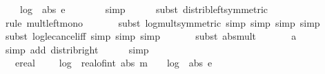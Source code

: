 \begin{isabellebody}
\ \ \ \ log\ {}\ {\isacharparenleft}{\kern0pt}abs\ e\ {\isacharplus}{\kern0pt}\ {}{\isacharparenright}{\kern0pt}{\isacharparenright}{\kern0pt}{\isacharparenright}{\kern0pt}{\isachardoublequoteclose}\isanewline
\ \ \ \ \isamarkupfalse%
\ {\isacharparenleft}{\kern0pt}simp{\isacharparenright}{\kern0pt}\isanewline
\ \ \ \ \isamarkupfalse%
\ {\isacharparenleft}{\kern0pt}subst\ distrib{\isacharunderscore}{\kern0pt}left{\isacharbrackleft}{\kern0pt}symmetric{\isacharbrackright}{\kern0pt}{\isacharparenright}{\kern0pt}\isanewline
\ \ \ \ \isamarkupfalse%
\ {\isacharparenleft}{\kern0pt}rule\ mult{\isacharunderscore}{\kern0pt}left{\isacharunderscore}{\kern0pt}mono{\isacharparenright}{\kern0pt}\isanewline
\ \ \ \ \ \isamarkupfalse%
\ {\isacharparenleft}{\kern0pt}subst\ log{\isacharunderscore}{\kern0pt}mult{\isacharbrackleft}{\kern0pt}symmetric{\isacharbrackright}{\kern0pt}{\isacharcomma}{\kern0pt}\ simp{\isacharcomma}{\kern0pt}\ simp{\isacharcomma}{\kern0pt}\ simp{\isacharcomma}{\kern0pt}\ simp{\isacharparenright}{\kern0pt}\isanewline
\ \ \ \ \ \isamarkupfalse%
\ {\isacharparenleft}{\kern0pt}subst\ log{\isacharunderscore}{\kern0pt}le{\isacharunderscore}{\kern0pt}cancel{\isacharunderscore}{\kern0pt}iff{\isacharcomma}{\kern0pt}\ simp{\isacharcomma}{\kern0pt}\ simp{\isacharcomma}{\kern0pt}\ simp{\isacharparenright}{\kern0pt}\isanewline
\ \ \ \ \ \isamarkupfalse%
\ {\isacharparenleft}{\kern0pt}subst\ abs{\isacharunderscore}{\kern0pt}mult{\isacharparenright}{\kern0pt}\isanewline
\ \ \ \ \ \isamarkupfalse%
\ a\ \isamarkupfalse%
\ {\isacharparenleft}{\kern0pt}simp\ add{\isacharcolon}{\kern0pt}\ distrib{\isacharunderscore}{\kern0pt}right{\isacharparenright}{\kern0pt}\isanewline
\ \ \ \ \isamarkupfalse%
\ simp\isanewline
\ \ \isamarkupfalse%
\ \isamarkupfalse%
\ {\isachardoublequoteopen}{\isachardot}{\kern0pt}{\isachardot}{\kern0pt}{\isachardot}{\kern0pt}\ {\isacharequal}{\kern0pt}\ ereal\ {\isacharparenleft}{\kern0pt}{}\ {\isacharplus}{\kern0pt}\ {}\ {\isacharasterisk}{\kern0pt}\ {\isacharparenleft}{\kern0pt}log\ {}\ {\isacharparenleft}{\kern0pt}real{\isacharunderscore}{\kern0pt}of{\isacharunderscore}{\kern0pt}int\ {\isacharparenleft}{\kern0pt}abs\ m{\isacharparenright}{\kern0pt}\ {\isacharplus}{\kern0pt}\ {}{\isacharparenright}{\kern0pt}\ {\isacharplus}{\kern0pt}\ log\ {}\ {\isacharparenleft}{\kern0pt}abs\ e\ {\isacharplus}{\kern0pt}\ {}{\isacharparenright}{\kern0pt}{\isacharparenright}{\kern0pt}{\isacharparenright}{\kern0pt}{\isachardoublequoteclose}\isanewline

\end{isabellebody}
